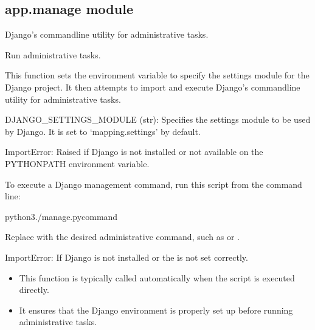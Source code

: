 \documentclass[letterpaper,10pt,english]{sphinxmanual}
\begin{document}
\subsection{app.manage module}
\label{\detokenize{app:module-app.manage}}\label{\detokenize{app:app-manage-module}}
\sphinxAtStartPar
Django’s command\sphinxhyphen{}line utility for administrative tasks.

\begin{fulllineitems}
\label{\detokenize{app:app.manage.main}}
\pysigstartsignatures
{}
\pysigstopsignatures
\sphinxAtStartPar
Run administrative tasks.

\sphinxAtStartPar
This function sets the  environment variable to specify the 
settings module for the Django project. It then attempts to import and execute Django’s 
command\sphinxhyphen{}line utility for administrative tasks.
\begin{description}
\sphinxAtStartPar
DJANGO\_SETTINGS\_MODULE (str): Specifies the settings module to be used by Django. 
It is set to ‘mapping.settings’ by default.

\sphinxAtStartPar
ImportError: Raised if Django is not installed or not available on the 
PYTHONPATH environment variable.

\sphinxAtStartPar
To execute a Django management command, run this script from the command line:

\begin{sphinxVerbatim}[commandchars=\\\{\}]
\PYGZdl{}python3./manage.py\PYGZlt{}command\PYGZgt{}
\end{sphinxVerbatim}

\sphinxAtStartPar
Replace  with the desired administrative command, such as  
or .

\sphinxAtStartPar
ImportError: If Django is not installed or the  is not set 
correctly.

\begin{itemize}
\item {} 
\sphinxAtStartPar
This function is typically called automatically when the script is executed directly.

\item {} 
\sphinxAtStartPar
It ensures that the Django environment is properly set up before running 
administrative tasks.

\end{itemize}

\end{description}

\end{fulllineitems}
\end{document}
